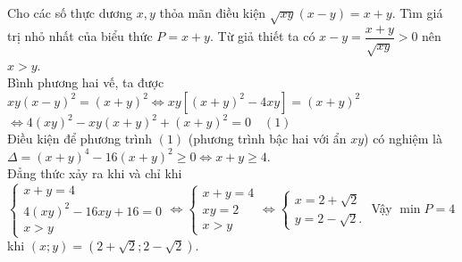 \begin{ex}%
	Cho các số thực dương $x,y$ thỏa mãn điều kiện $\sqrt{xy}(x-y)=x+y$. Tìm giá trị nhỏ nhất của biểu thức $P=x+y$.
	\loigiai
    {
    Từ giả thiết ta có $x-y=\dfrac{x+y}{\sqrt{xy}}>0$ nên $x>y$.\\
    Bình phương hai vế, ta được\\
    $xy(x-y)^2=(x+y)^2\Leftrightarrow xy\left[ (x+y)^2-4xy\right] =(x+y)^2$\\
    $\Leftrightarrow 4(xy)^2-xy(x+y)^2+(x+y)^2=0\quad (1)$\\
    Điều kiện để phương trình $(1)$ (phương trình bậc hai với ẩn $xy$) có nghiệm là\\
    $\Delta=(x+y)^4-16(x+y)^2\ge 0\Leftrightarrow x+y\ge 4$.\\
    Đẳng thức xảy ra khi và chỉ khi
    $\begin{cases} x+y=4\\ 4(xy)^2-16xy+16=0\\ x>y \end{cases}
    \Leftrightarrow \begin{cases} x+y=4\\ xy=2\\ x>y \end{cases}
    \Leftrightarrow \begin{cases} x=2+\sqrt{2}\\ y=2-\sqrt{2}. \end{cases}$
    Vậy $\min P=4$ khi $(x;y)=\left(2+\sqrt{2};2-\sqrt{2}\right)$.
    }
\end{ex}

